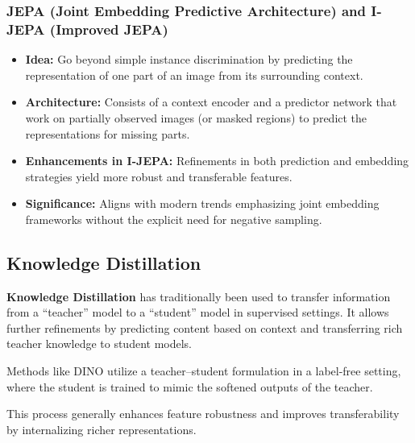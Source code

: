 \documentclass{article}
\begin{document}
\subsubsection{JEPA (Joint Embedding Predictive Architecture) and I-JEPA (Improved JEPA)}
\begin{itemize}
    \item \textbf{Idea:} Go beyond simple instance discrimination by predicting the representation of one part of an image from its surrounding context.
    \item \textbf{Architecture:} Consists of a context encoder and a predictor network that work on partially observed images (or masked regions) to predict the representations for missing parts.
    \item \textbf{Enhancements in I-JEPA:} Refinements in both prediction and embedding strategies yield more robust and transferable features.
    \item \textbf{Significance:} Aligns with modern trends emphasizing joint embedding frameworks without the explicit need for negative sampling.
\end{itemize}

\subsection{Knowledge Distillation}

\textbf{Knowledge Distillation} has traditionally been used to transfer information from a “teacher” model to a “student” model in supervised settings. It allows further refinements by predicting content based on context and transferring rich teacher knowledge to student models.

Methods like DINO utilize a teacher--student formulation in a label-free setting, where the student is trained to mimic the softened outputs of the teacher.

This process generally enhances feature robustness and improves transferability by internalizing richer representations.
\end{document}
